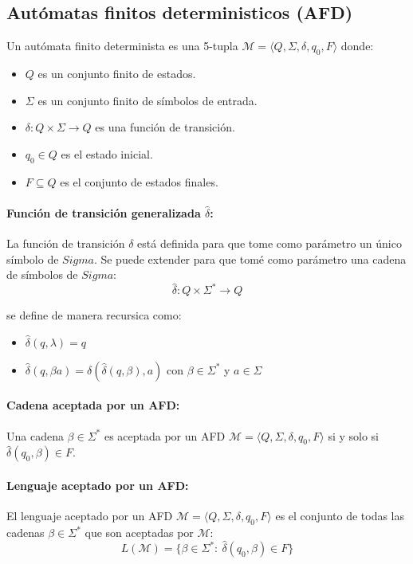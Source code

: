 \subsection{Autómatas finitos deterministicos (AFD)}
Un autómata finito determinista es una 5-tupla \(\mathcal{M}=\langle Q,\Sigma,\delta,q_0,F\rangle\) donde:
\begin{itemize}
  \item \(Q\) es un conjunto finito de estados.
  \item \(\Sigma\) es un conjunto finito de símbolos de entrada.
  \item \(\delta:Q\times\Sigma\to Q\) es una función de transición.
  \item \(q_0\in Q\) es el estado inicial.
  \item \(F\subseteq Q\) es el conjunto de estados finales.
\end{itemize}

\paragraph{Función de transición generalizada \(\hat{\delta}\):} La función de transición \(\delta\) está definida para que tome como parámetro un único símbolo de \(Sigma\). Se puede extender para que tomé como parámetro una cadena de símbolos de \(Sigma\):
\[ \hat{\delta} : Q\times\Sigma^*\to Q\]

se define de manera recursica como:
\begin{itemize}
  \item \(\hat{\delta}(q,\lambda)=q\)
  \item \(\hat{\delta}(q,\beta a)=\delta(\hat{\delta}(q,\beta),a)\) con \(\beta\in\Sigma^*\) y \(a\in\Sigma\)
\end{itemize}

\paragraph{Cadena aceptada por un AFD:} Una cadena \(\beta\in\Sigma^*\) es aceptada por un AFD \(\mathcal{M} = \langle Q, \Sigma, \delta, q_0, F\rangle\) si y solo si \(\hat{\delta}(q_0,\beta)\in F\).

\paragraph{Lenguaje aceptado por un AFD:} El lenguaje aceptado por un AFD \(\mathcal{M} = \langle Q, \Sigma, \delta, q_0, F\rangle\) es el conjunto de todas las cadenas \(\beta\in\Sigma^*\) que son aceptadas por \(\mathcal{M}\):
\[ L(\mathcal{M}) = \{ \beta\in\Sigma^*:~\hat{\delta}(q_0,\beta)\in F\}\]

